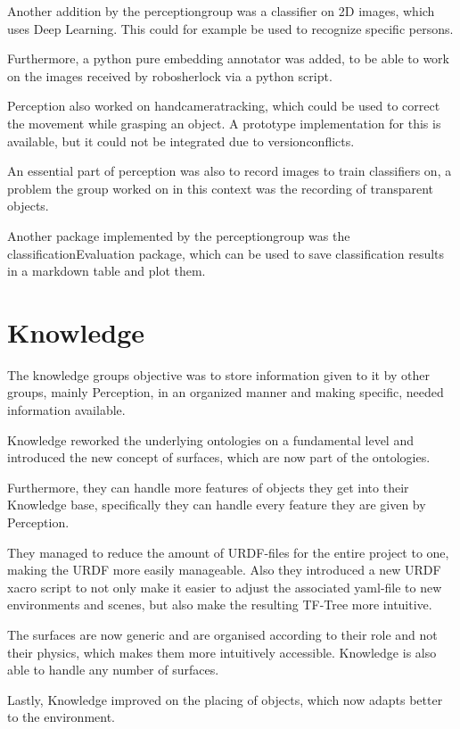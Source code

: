 \documentclass[main.tex]{subfiles}
\begin{document}
		Another addition by the perceptiongroup was a classifier on 2D images, which uses Deep Learning. This could for example be used to recognize specific persons.
		
		Furthermore, a python pure embedding annotator was added, to be able to work on the images received by robosherlock via a python script.
		
		Perception also worked on handcameratracking, which could be used to correct the movement while grasping an object. A prototype implementation for this is available, but it could not be integrated due to versionconflicts. 
		
		An essential part of perception was also to record images to train classifiers on, a problem the group worked on in this context was the recording of transparent objects.
		
		Another package implemented by the perceptiongroup was the classificationEvaluation package, which can be used to save classification results in a markdown table and plot them.
		
		
		
		
		\section{Knowledge}
		The knowledge groups objective was to store information given to it by other groups, mainly Perception, in an organized manner and making specific, needed information available.
		
		Knowledge reworked the underlying ontologies on a fundamental level and introduced the new concept of surfaces, which are now part of the ontologies.
		
		Furthermore, they can handle more features of objects they get into their Knowledge base, specifically they can handle every feature they are given by Perception.
		
		They managed to reduce the amount of URDF-files for the entire project to one, making the URDF more easily manageable.  Also they introduced a new URDF xacro script to not only make it easier to adjust the associated yaml-file to new environments and scenes, but also make the resulting TF-Tree more intuitive.
		
		The surfaces are now generic and are organised according to their role and not their physics, which makes them more intuitively accessible. Knowledge is also able to handle any number of surfaces.
		
		Lastly, Knowledge improved on the placing of objects, which now adapts better to the environment. 		
\end{document}
